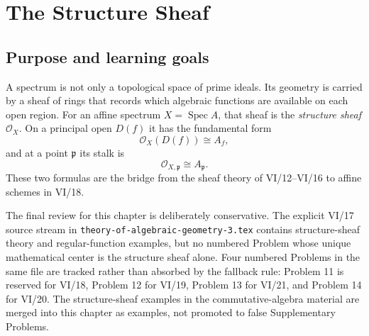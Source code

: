 
\chapter{The Structure Sheaf}
\label{ch:structure-sheaf}
\providecommand{\OO}{\mathcal O}
\providecommand{\OOX}{\mathcal O_X}
\providecommand{\Spec}{\operatorname{Spec}}
\providecommand{\Frac}{\operatorname{Frac}}
\providecommand{\Nil}{\operatorname{Nil}}
\providecommand{\kappaof}[1]{\kappa(#1)}
\providecommand{\mfp}{\mathfrak p}
\providecommand{\mfq}{\mathfrak q}
\providecommand{\mfm}{\mathfrak m}
\providecommand{\id}{\operatorname{id}}

\section*{Purpose and learning goals}

A spectrum is not only a topological space of prime ideals.  Its geometry is carried by a
sheaf of rings that records which algebraic functions are available on each open region.
For an affine spectrum $X=\Spec A$, that sheaf is the \emph{structure sheaf} $\OO_X$.
On a principal open $D(f)$ it has the fundamental form
\[
\OO_X(D(f))\cong A_f,
\]
and at a point $\mfp$ its stalk is
\[
\OO_{X,\mfp}\cong A_{\mfp}.
\]
These two formulas are the bridge from the sheaf theory of VI/12--VI/16 to affine schemes
in VI/18.

The final review for this chapter is deliberately conservative.  The explicit VI/17 source
stream in \texttt{theory-of-algebraic-geometry-3.tex} contains structure-sheaf theory and
regular-function examples, but no numbered Problem whose unique mathematical center is the
structure sheaf alone.  Four numbered Problems in the same file are tracked rather
than absorbed by the fallback rule: Problem 11 is reserved for VI/18, Problem 12 for VI/19,
Problem 13 for VI/21, and Problem 14 for VI/20.  The structure-sheaf examples in the
commutative-algebra material are merged into this chapter as examples, not promoted to false
Supplementary Problems.

